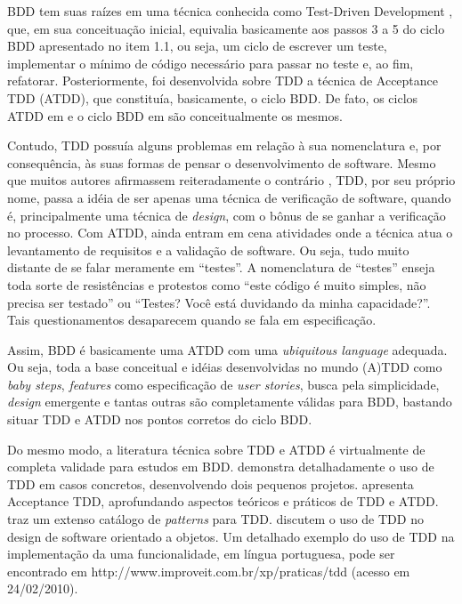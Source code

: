 \documentclass[a4paper,abntfigtabnum,noindentfirst]{abnt}
\begin{document}
BDD tem suas raízes em uma técnica conhecida como Test-Driven Development \cite{TDDByExample}, que, em sua conceituação inicial, equivalia basicamente aos passos 3 a 5 do ciclo BDD apresentado no item 1.1, ou seja, um ciclo de escrever um teste, implementar o mínimo de código necessário para passar no teste e, ao fim, refatorar. Posteriormente, foi desenvolvida sobre TDD a técnica de Acceptance TDD (ATDD), que constituía, basicamente, o ciclo BDD. De fato, os ciclos ATDD em  e o ciclo BDD em  são conceitualmente os mesmos.

Contudo, TDD possuía alguns problemas em relação à sua nomenclatura e, por consequência, às suas formas de pensar o desenvolvimento de software. Mesmo que muitos autores afirmassem reiteradamente o contrário \cite{DrivingSoftwareQualityCrispin} \cite{TDDAstels} \cite{TDDDesignJanzen}, TDD, por seu próprio nome, passa a idéia de ser apenas uma técnica de verificação de software, quando é, principalmente uma técnica de \textit{design}, com o bônus de se ganhar a verificação no processo. Com ATDD, ainda entram em cena atividades onde a técnica atua o levantamento de requisitos e a validação de software. Ou seja, tudo muito distante de se falar meramente em ``testes''. A nomenclatura de ``testes'' enseja toda sorte de resistências e protestos como ``este código é muito simples, não precisa ser testado'' ou ``Testes? Você está duvidando da minha capacidade?''. Tais questionamentos desaparecem quando se fala em especificação.

Assim, BDD é basicamente uma ATDD com uma \textit{ubiquitous language} adequada. Ou seja, toda a base conceitual e idéias desenvolvidas no mundo (A)TDD como \textit{baby steps}, \textit{features} como especificação de \textit{user stories}, busca pela simplicidade, \textit{design} emergente e tantas outras são completamente válidas para BDD, bastando situar TDD e ATDD nos pontos corretos do ciclo BDD.

Do mesmo modo, a literatura técnica sobre TDD e ATDD é virtualmente de completa validade para estudos em BDD.   demonstra detalhadamente o uso de TDD em casos concretos, desenvolvendo dois pequenos projetos.  apresenta Acceptance TDD, aprofundando aspectos teóricos e práticos de TDD e ATDD.  traz um extenso catálogo de \textit{patterns} para TDD.  discutem o uso de TDD no design de software orientado a objetos. Um detalhado exemplo do uso de TDD na implementação da uma funcionalidade, em língua portuguesa, pode ser encontrado em http://www.improveit.com.br/xp/praticas/tdd (acesso em 24/02/2010).
\end{document}
